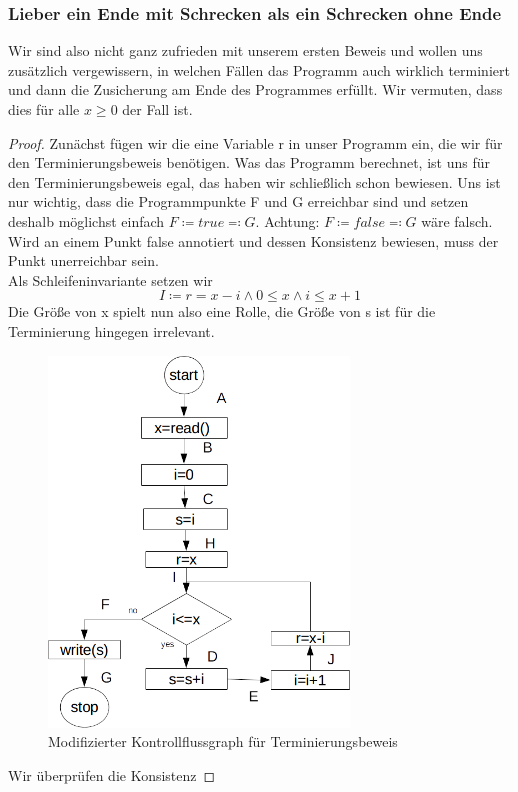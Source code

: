 \documentclass[hidelinks]{article}
\theoremstyle{plain}
\theoremstyle{definition}
\theoremstyle{rem}
\begin{document}
\begin{sloppypar}
 \subsubsection{Lieber ein Ende mit Schrecken als ein Schrecken ohne Ende}
 Wir sind also nicht ganz zufrieden mit unserem ersten Beweis und wollen uns zusätzlich vergewissern, in welchen Fällen das Programm auch wirklich terminiert und dann die Zusicherung am Ende des Programmes erfüllt. Wir vermuten, dass dies für alle $x\ge 0$ der Fall ist.
\begin{proof}
Zunächst fügen wir die eine Variable r in unser Programm ein, die wir für den Terminierungsbeweis benötigen. Was das Programm berechnet, ist uns für den Terminierungsbeweis egal, das haben wir schließlich schon bewiesen. Uns ist nur wichtig, dass die Programmpunkte F und G erreichbar sind und setzen deshalb möglichst einfach $F\coloneqq true\eqqcolon G$. Achtung: $F\coloneqq false\eqqcolon G$ wäre falsch. Wird an einem Punkt false annotiert und dessen Konsistenz bewiesen, muss der Punkt unerreichbar sein.\\
Als Schleifeninvariante setzen wir
\begin{equation*} 
I\coloneqq r=x-i\wedge 0\le x \wedge i\le x+1 
\end{equation*}
Die Größe von x spielt nun also eine Rolle, die Größe von s ist für die Terminierung hingegen irrelevant.
\begin{figure}[H]
	\includegraphics[width=8cm]{gauss_sum_termination.png}
	\centering
	\caption{Modifizierter Kontrollflussgraph für Terminierungsbeweis}
\end{figure}
Wir überprüfen die Konsistenz

\end{proof}
\end{sloppypar}
\end{document}
